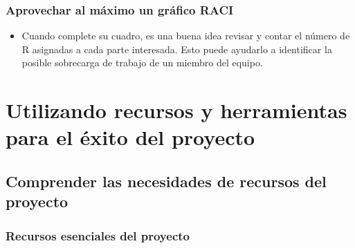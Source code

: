 \documentclass[10pt]{book}
\begin{document}
	\subsection{Aprovechar al máximo un gráfico RACI}
	\begin{itemize}
	    \item Cuando complete su cuadro, es una buena idea revisar y contar el número de R asignadas a cada parte interesada. Esto puede ayudarlo a identificar la posible sobrecarga de trabajo de un miembro del equipo. 
	\end{itemize}



\chapter{Utilizando recursos y herramientas para el éxito del proyecto}

    \section{Comprender las necesidades de recursos del proyecto}
	
	\subsection{Recursos esenciales del proyecto}
	    
\end{document}

